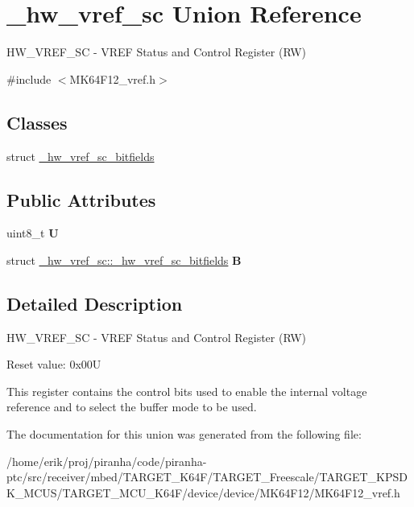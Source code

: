 \hypertarget{union__hw__vref__sc}{}\section{\+\_\+hw\+\_\+vref\+\_\+sc Union Reference}
\label{union__hw__vref__sc}


H\+W\+\_\+\+V\+R\+E\+F\+\_\+\+SC -\/ V\+R\+EF Status and Control Register (RW)  




{\ttfamily \#include $<$M\+K64\+F12\+\_\+vref.\+h$>$}

\subsection*{Classes}
\begin{DoxyCompactItemize}
\item 
struct \hyperlink{struct__hw__vref__sc_1_1__hw__vref__sc__bitfields}{\+\_\+hw\+\_\+vref\+\_\+sc\+\_\+bitfields}
\end{DoxyCompactItemize}
\subsection*{Public Attributes}
\begin{DoxyCompactItemize}
\item 
uint8\+\_\+t {\bfseries U}\hypertarget{union__hw__vref__sc_a0d63bb80cc94cf554961ca71a0faf118}{}\label{union__hw__vref__sc_a0d63bb80cc94cf554961ca71a0faf118}

\item 
struct \hyperlink{struct__hw__vref__sc_1_1__hw__vref__sc__bitfields}{\+\_\+hw\+\_\+vref\+\_\+sc\+::\+\_\+hw\+\_\+vref\+\_\+sc\+\_\+bitfields} {\bfseries B}\hypertarget{union__hw__vref__sc_a3fc8df6ffd4945cdc288ee1c360d5804}{}\label{union__hw__vref__sc_a3fc8df6ffd4945cdc288ee1c360d5804}

\end{DoxyCompactItemize}


\subsection{Detailed Description}
H\+W\+\_\+\+V\+R\+E\+F\+\_\+\+SC -\/ V\+R\+EF Status and Control Register (RW) 

Reset value\+: 0x00U

This register contains the control bits used to enable the internal voltage reference and to select the buffer mode to be used. 

The documentation for this union was generated from the following file\+:\begin{DoxyCompactItemize}
\item 
/home/erik/proj/piranha/code/piranha-\/ptc/src/receiver/mbed/\+T\+A\+R\+G\+E\+T\+\_\+\+K64\+F/\+T\+A\+R\+G\+E\+T\+\_\+\+Freescale/\+T\+A\+R\+G\+E\+T\+\_\+\+K\+P\+S\+D\+K\+\_\+\+M\+C\+U\+S/\+T\+A\+R\+G\+E\+T\+\_\+\+M\+C\+U\+\_\+\+K64\+F/device/device/\+M\+K64\+F12/M\+K64\+F12\+\_\+vref.\+h\end{DoxyCompactItemize}
